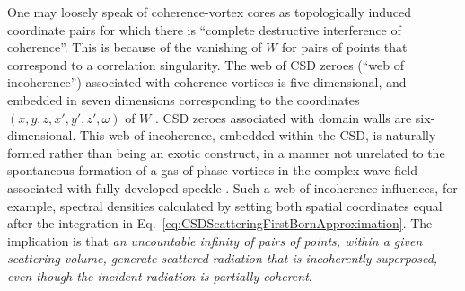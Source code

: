 \documentclass[%
 reprint,
 amsmath,amssymb,
 aps,
]{revtex4-1}
\begin{document}
One may loosely speak of coherence-vortex cores as topologically induced coordinate pairs for which there is ``complete destructive interference of coherence''. This is because of the vanishing of $W$ for pairs of points that correspond to a correlation singularity.  The web of CSD zeroes (``web of incoherence'') associated with coherence vortices is five-dimensional, and embedded in seven dimensions corresponding to the coordinates $(x,y,z,x',y',z',\omega)$ of $W$ \cite{Marasinghe2010}. CSD zeroes associated with domain walls are six-dimensional.  This web of incoherence, embedded within the CSD, is naturally formed rather than being an exotic construct, in a manner not unrelated to the spontaneous formation of a gas of phase vortices in the complex wave-field associated with fully developed speckle \cite{OHolleran2008}.  Such a web of incoherence influences, for example, spectral densities calculated by setting both spatial coordinates equal after the integration in Eq.~\ref{eq:CSDScatteringFirstBornApproximation}.  The implication is that {\em an uncountable infinity of pairs of points, within a given scattering volume, generate scattered radiation that is incoherently superposed, even though the incident radiation is partially coherent}.


\end{document}
